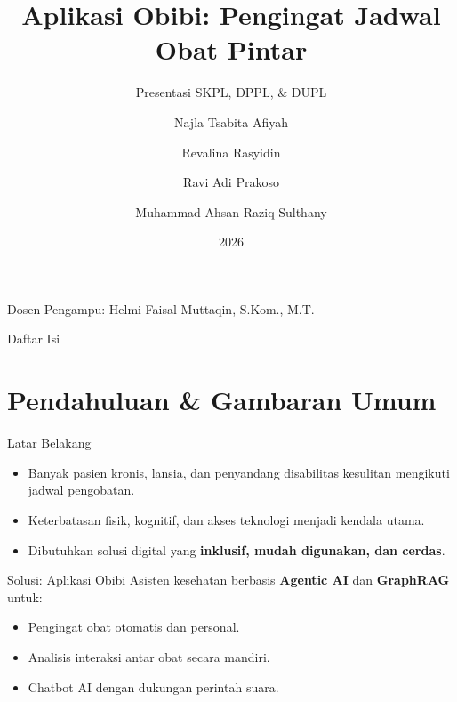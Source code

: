 \documentclass[10pt, aspectratio=169]{beamer}
\title{Aplikasi Obibi: Pengingat Jadwal Obat Pintar}
\subtitle{Presentasi SKPL, DPPL, \& DUPL}
\author{Najla Tsabita Afiyah \and Revalina Rasyidin \and Ravi Adi Prakoso \and Muhammad Ahsan Raziq Sulthany}
\institute[Universitas Telkom]{\small Program Studi S1 Informatika\\Fakultas Informatika\\Universitas Telkom}
\date{2026}
\begin{document}
\begin{frame}
    \titlepage
    \begin{center}
        \tiny{Dosen Pengampu: Helmi Faisal Muttaqin, S.Kom., M.T.}
    \end{center}
\end{frame}

\begin{frame}{Daftar Isi}
    \tableofcontents
\end{frame}

\section{Pendahuluan \& Gambaran Umum}

\begin{frame}{Latar Belakang}
    \begin{itemize}
        \item Banyak pasien kronis, lansia, dan penyandang disabilitas kesulitan mengikuti jadwal pengobatan.
        \item Keterbatasan fisik, kognitif, dan akses teknologi menjadi kendala utama.
        \item Dibutuhkan solusi digital yang \textbf{inklusif, mudah digunakan, dan cerdas}.
    \end{itemize}
    \vspace{0.5cm}
    \begin{block}{Solusi: Aplikasi Obibi}
        Asisten kesehatan berbasis \textbf{Agentic AI} dan \textbf{GraphRAG} untuk:
        \begin{itemize}
            \item Pengingat obat otomatis dan personal.
            \item Analisis interaksi antar obat secara mandiri.
            \item Chatbot AI dengan dukungan perintah suara.
        \end{itemize}
    \end{block}
\end{frame}
\end{document}
